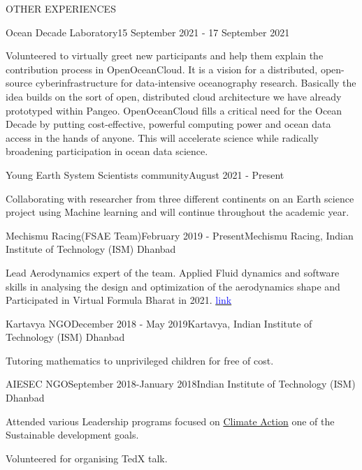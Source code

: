 \documentclass{resume} %
\begin{document}
\begin{rSection}{OTHER EXPERIENCES}
\begin{rSubsection}{Ocean Decade Laboratory}{15 September 2021 - 17 September 2021}{}
\item Volunteered to virtually greet new participants and help them explain the contribution process in OpenOceanCloud. It is a vision for a distributed, open-source cyberinfrastructure for data-intensive oceanography research. Basically the idea builds on the sort of open, distributed cloud architecture we have already prototyped within Pangeo. OpenOceanCloud fills a critical need for the Ocean Decade by putting cost-effective, powerful computing power and ocean data access in the hands of anyone. This will accelerate science while radically broadening participation in ocean data science. 
\end{rSubsection}
\begin{rSubsection}{Young Earth System Scientists community}{August 2021 - Present}{}
\item Collaborating with researcher from three different continents on an Earth science project using Machine learning and will continue throughout the academic year. 
\end{rSubsection}
\begin{rSubsection}{Mechismu Racing(FSAE Team)}{February 2019 - Present}{Mechismu Racing, Indian Institute of Technology (ISM) Dhanbad}
\item Lead Aerodynamics expert of the team. Applied Fluid dynamics and software skills in analysing the design and optimization of the aerodynamics shape and Participated in Virtual Formula Bharat in 2021. 
\href{https://drive.google.com/file/d/1gxg4ES_sFsu9u8YnKFnXOZkrpout1oJu/view?usp=sharing}{\textcolor{blue}{link}}

\end{rSubsection}

\begin{rSubsection}{Kartavya NGO}{December 2018 - May 2019}{Kartavya, Indian Institute of Technology (ISM) Dhanbad}
\item Tutoring mathematics to unprivileged children for free of cost. 
\end{rSubsection}

\begin{rSubsection}{AIESEC NGO}{September 2018-January 2018}{Indian Institute of Technology (ISM) Dhanbad}
\item Attended various Leadership programs focused on \underline{Climate Action} one of the Sustainable development goals.
\item Volunteered for organising TedX talk. 
\end{rSubsection}

\end{rSection}
\end{document}
